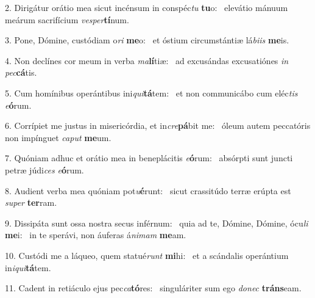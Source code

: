 2. Dirigátur orátio mea sicut incénsum in conspéc\textit{tu} \textbf{tu}o: \ast\  elevátio mánuum meárum sacrifícium \textit{ves}\textit{per}\textbf{tí}num.\

3. Pone, Dómine, custódiam o\textit{ri} \textbf{me}o: \ast\  et óstium circumstántiæ lá\textit{bi}\textit{is} \textbf{me}is.\

4. Non declínes cor meum in verba \textit{ma}\textbf{lí}tiæ: \ast\  ad excusándas excusatiónes \textit{in} \textit{pec}\textbf{cá}tis.\

5. Cum homínibus operántibus ini\textit{qui}\textbf{tá}tem: \ast\  et non communicábo cum eléc\textit{tis} \textit{e}\textbf{ó}rum.\

6. Corrípiet me justus in misericórdia, et in\textit{cre}\textbf{pá}bit me: \ast\  óleum autem peccatóris non impínguet \textit{ca}\textit{put} \textbf{me}um.\

7. Quóniam adhuc et orátio mea in beneplácitis \textit{e}\textbf{ó}rum: \ast\  absórpti sunt juncti petræ júdi\textit{ces} \textit{e}\textbf{ó}rum.\

8. Audient verba mea quóniam pot\textit{u}\textbf{é}runt: \ast\  sicut crassitúdo terræ erúpta est \textit{su}\textit{per} \textbf{ter}ram.\

9. Dissipáta sunt ossa nostra secus inférnum: \dag\  quia ad te, Dómine, Dómine, ócu\textit{li} \textbf{me}i: \ast\  in te sperávi, non áuferas á\textit{ni}\textit{mam} \textbf{me}am.\

10. Custódi me a láqueo, quem statué\textit{runt} \textbf{mi}hi: \ast\  et a scándalis operántium in\textit{i}\textit{qui}\textbf{tá}tem.\

11. Cadent in retiáculo ejus pec\textit{ca}\textbf{tó}res: \ast\  singuláriter sum ego \textit{do}\textit{nec} \textbf{tráns}eam.\

